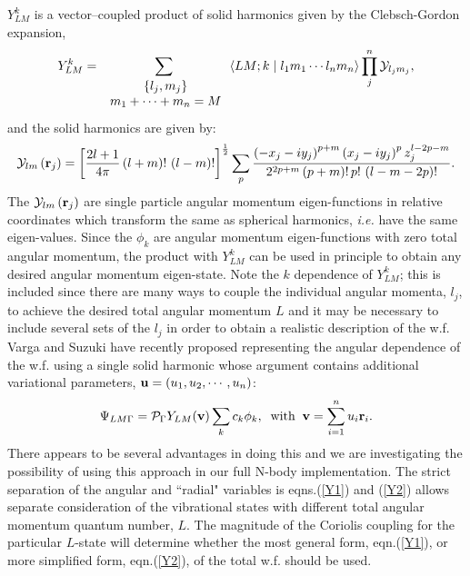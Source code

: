$Y_{LM}^k$ is a vector--coupled product of solid harmonics\cite{Biedenharn81}
given by the Clebsch-Gordon expansion, 
\begin{equation}
Y_{LM}^k=\sum_{\,\,\begin{array}{c} {\left\{ l_j,m_j\right\} }
\\ {m_1+\cdots
+m_n=M} \end{array}
}\left\langle LM;k\right. |\left. l_1m_1\cdots l_nm_n\right\rangle
%
\prod_j^n{\cal Y}_{l_jm_j},
\end{equation}
and the solid harmonics are given by:
\begin{equation}
{\cal Y}_{lm}\left( {\bf r}_j\right) =\left[ \frac{2l+1}{4\pi }\left(
l+m\right) !\,\left( l-m\right) !\right] ^{\frac 12}\sum_p\frac{\left(
-x_j-iy_j\right) ^{p+m}\left( x_j-iy_j\right) ^pz_j^{l-2p-m}}{2^{2p+m}\left(
p+m\right) !\,p!\,\left( l-m-2p\right) !}.
\end{equation}
The ${\cal Y}_{lm}\left( {\bf r}_j\right) $ are single particle
angular momentum eigen-functions in relative coordinates which transform the
same as spherical harmonics, {\it i.e.} have the same eigen-values. Since
the $\phi _k$ are angular momentum eigen-functions with zero total angular
momentum, the product with $Y_{LM}^k$ can be used in principle to obtain any
desired angular momentum eigen-state. Note the $k$ dependence of $Y_{LM}^k$;
this is included since there are many ways to couple the individual angular
momenta, $l_j$, 
to achieve the desired total angular momentum $L$ and it may
be necessary to include several sets of the $l_j$ in order to obtain a
realistic description of the w.f. Varga and Suzuki\cite{Varga95}
have recently
proposed representing the angular dependence of the w.f. using
a single solid harmonic whose argument contains additional variational
parameters, ${\bf u} = (u_1, u_2, \cdots, u_n)$:
\begin{equation}
\Psi_{LM\Gamma } = {\cal P}_\Gamma Y_{LM}({\bf v}) \sum_k c_k \phi_k,
\; \; {\rm with} \; \; 
{\bf v} = \sum_{i=1}^{n} u_i {\bf r}_i.
\label{Y2}
\end{equation}
There appears to be several advantages in doing this and we are
investigating the possibility of using this approach in our full N-body
implementation.
The strict separation of the angular and ``radial" variables is
eqns.(\ref{Y1}) and (\ref{Y2}) allows separate consideration of
the vibrational states with different total angular momentum
quantum number, $L$. The magnitude of the Coriolis coupling
for the particular $L$-state will determine whether the most
general form, eqn.(\ref{Y1}), or more simplified form,
eqn.(\ref{Y2}), of the total w.f. should be used. 

